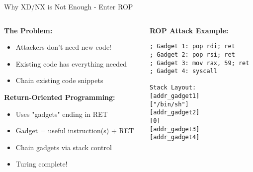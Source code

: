 \documentclass[aspectratio=169,12pt]{beamer}
\begin{document}
\begin{frame}[fragile]{Why XD/NX is Not Enough - Enter ROP}
    \begin{columns}
        \begin{column}{0.5\textwidth}
            \textbf{The Problem:}
            \begin{itemize}
                \item Attackers don't need new code!
                \item Existing code has everything needed
                \item Chain existing code snippets
            \end{itemize}
            
            \vspace{0.3cm}
            \textbf{Return-Oriented Programming:}
            \begin{itemize}
                \item Uses "gadgets" ending in RET
                \item Gadget = useful instruction(s) + RET
                \item Chain gadgets via stack control
                \item Turing complete!
            \end{itemize}
        \end{column}
        \begin{column}{0.5\textwidth}
            \begin{tcolorbox}[colback=gray!10]
                \small
                \textbf{ROP Attack Example:}
                \begin{verbatim}
; Gadget 1: pop rdi; ret
; Gadget 2: pop rsi; ret  
; Gadget 3: mov rax, 59; ret
; Gadget 4: syscall

Stack Layout:
[addr_gadget1]
["/bin/sh"]
[addr_gadget2]
[0]
[addr_gadget3]
[addr_gadget4]
                \end{verbatim}
            \end{tcolorbox}
            
        \end{column}
    \end{columns}
\end{frame}
\end{document}
